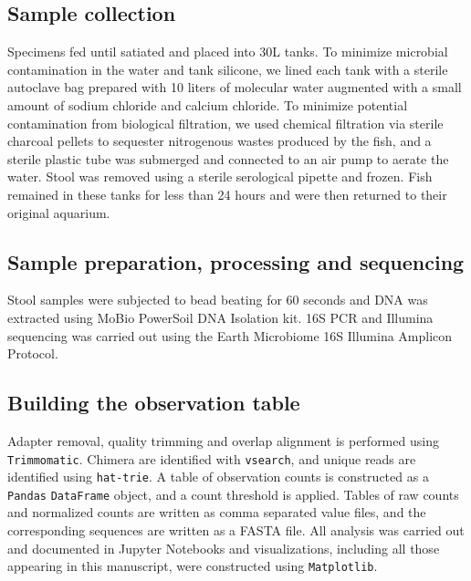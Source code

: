 





\subsection{Sample collection}

Specimens fed until satiated and placed into 30L tanks. To minimize microbial contamination in the water and tank silicone, we lined each tank with a sterile autoclave bag prepared with 10 liters of molecular water augmented with a small amount of sodium chloride and calcium chloride. To minimize potential contamination from biological filtration, we used chemical filtration via sterile charcoal pellets to sequester nitrogenous wastes produced by the fish, and a sterile plastic tube was submerged and connected to an air pump to aerate the water. Stool was removed using a sterile serological pipette and frozen. Fish remained in these tanks for less than 24 hours and were then returned to their original aquarium.

\subsection{Sample preparation, processing and sequencing}

Stool samples were subjected to bead beating for 60 seconds and DNA was extracted using MoBio PowerSoil DNA Isolation kit. 16S PCR and Illumina sequencing was carried out using the Earth Microbiome 16S Illumina Amplicon Protocol. 

\subsection{Building the observation table}

Adapter removal, quality trimming and overlap alignment is performed using {\tt Trimmomatic}. \cite{bolger2014trimmomatic} Chimera are identified with {\tt vsearch}, \cite{rognes2016vsearch} and unique reads are identified using {\tt hat-trie}. \cite{askitis2005cache, askitis2007hat} A table of observation counts is constructed as a {\tt Pandas} {\tt DataFrame} object, \cite{mckinney2010data} and a count threshold is applied. Tables of raw counts and normalized counts are written as comma separated value files, and the corresponding sequences are written as a FASTA file. All analysis was carried out and documented in Jupyter Notebooks \cite{perez2007ipython} and visualizations, including all those appearing in this manuscript, were constructed using {\tt Matplotlib}. \cite{hunter2007matplotlib}


